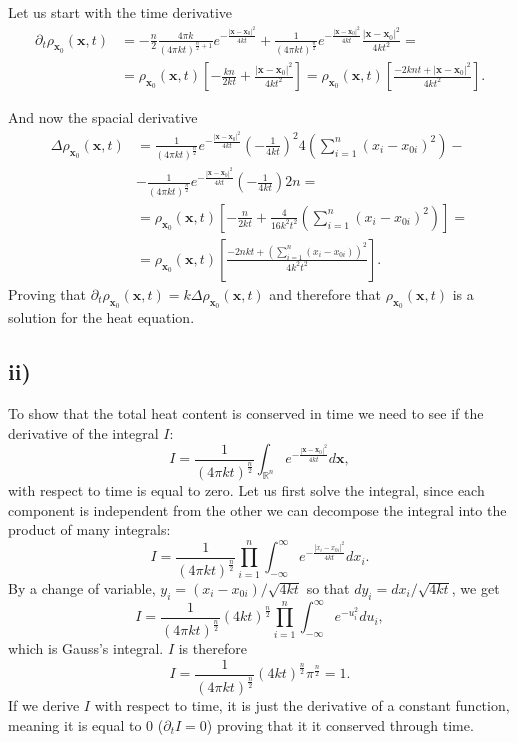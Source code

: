 \documentclass{article}[a4paper]
\begin{document}
Let us start with the time derivative
\[
    \begin{split}
        \partial_t \rho_{\mathbf{x}_0} (\mathbf{x},t) &= - \frac{n}{2} \frac{4\pi k}{(4\pi k t)^{\frac{n}{2} +1}} e^{-\frac{|\mathbf{x}-\mathbf{x}_0|^2}{4kt}} + \frac{1}{(4\pi k t)^{\frac{n}{2}}} e^{-\frac{|\mathbf{x}-\mathbf{x}_0|^2}{4kt}} \frac{|\mathbf{x}-\mathbf{x}_0|^2}{4 k t^2} = \\
        &= \rho_{\mathbf{x}_0} (\mathbf{x},t) \left[ -\frac{k n}{2 k t} + \frac{|\mathbf{x}-\mathbf{x}_0|^2}{4kt^2} \right] = \rho_{\mathbf{x}_0} (\mathbf{x},t) \left[\frac{- 2 k n t + |\mathbf{x}-\mathbf{x}_0|^2}{4 k t^2} \right].
    \end{split}
\]

And now the spacial derivative
\[
    \begin{split}
        \Delta \rho_{\mathbf{x}_0} (\mathbf{x},t) &= \frac{1}{(4 \pi k t)^{\frac{n}{2}}} e^{-\frac{|\mathbf{x}- \mathbf{x}_0|^2}{4kt}} \left( -\frac{1}{4kt} \right)^2 4\left( \sum_{i=1}^{n} (x_i - x_{0i})^2 \right) -\\
        &- \frac{1}{(4 \pi k t)^{\frac{n}{2}}} e^{-\frac{|\mathbf{x}- \mathbf{x}_0|^2}{4kt}} \left( -\frac{1}{4kt} \right) 2n = \\
        &=\rho_{\mathbf{x}_0} (\mathbf{x},t) \left[ -\frac{n}{2kt} + \frac{4}{16k^2t^2} \left( \sum_{i=1}^{n}(x_i - x_{0i})^2 \right) \right] =\\
        &= \rho_{\mathbf{x}_0} (\mathbf{x},t) \left[ \frac{-2nkt + \left( \sum_{i=1}^{n}(x_i - x_{0i}) \right)^2}{4k^2t^2} \right].
    \end{split}
\]
Proving that $\partial_t \rho_{\mathbf{x}_0} (\mathbf{x},t) = k \Delta \rho_{\mathbf{x}_0} (\mathbf{x},t)$ and therefore that $\rho_{\mathbf{x}_0} (\mathbf{x},t)$ is a solution for the heat equation.
\subsection*{ii)}

To show that the total heat content is conserved in time we need to see if the derivative of the integral $I$:
\[
    I = \frac{1}{(4\pi k t)^\frac{n}{2}} \int_{\mathbb{R}^n} e^{-\frac{|\mathbf{x}- \mathbf{x}_0|^2}{4kt}} d \mathbf{x},
\]
with respect to time is equal to zero. Let us first solve the integral, since each component is independent from the other we can decompose the integral into the product of many integrals:
\[
     I = \frac{1}{(4\pi k t)^\frac{n}{2}} \prod^n_{i=1}\int^{\infty}_{-\infty} e^{-\frac{|x_i- x_{0i}|^2}{4kt}} d x_i.
\]
By a change of variable, $y_i = {(x_i - x_{0i})}/{\sqrt{4kt}}$ so that $d y_i = dx_i / \sqrt{4kt}$, we get
\[
    I = \frac{1}{(4\pi k t)^\frac{n}{2}} (4kt)^{\frac{n}{2}} \prod^n_{i=1}\int^{\infty}_{-\infty} e^{-u_i^2} du_i,
\]
which is Gauss's integral. $I$ is therefore
\[
    I = \frac{1}{(4\pi k t)^\frac{n}{2}} (4kt)^{\frac{n}{2}} \pi^{\frac{n}{2}} = 1.
\]
If we derive $I$ with respect to time, it is just the derivative of a constant function, meaning it is equal to 0 ($\partial_t I = 0$) proving that it it conserved through time.
\end{document}
